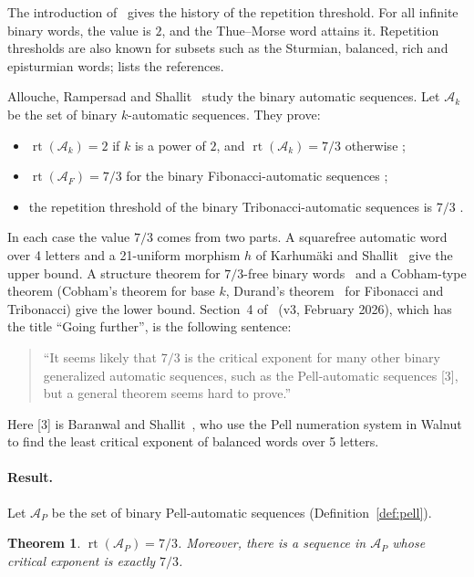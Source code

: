 \documentclass[11pt]{article}
\newtheorem{theorem}{Theorem}
\theoremstyle{definition}
\theoremstyle{remark}
\DeclareMathOperator{\rt}{rt}
\newcommand{\AP}{\mathcal{A}_P}
\begin{document}
The introduction of~\cite{ARS} gives the history of the repetition threshold. For all infinite binary words, the value is $2$, and the Thue--Morse word attains it. Repetition thresholds are also known for subsets such as the Sturmian, balanced, rich and episturmian words; \cite{ARS} lists the references.

Allouche, Rampersad and Shallit~\cite{ARS} study the binary automatic sequences. Let $\mathcal{A}_k$ be the set of binary $k$-automatic sequences. They prove:
\begin{itemize}
\item $\rt(\mathcal{A}_k) = 2$ if $k$ is a power of $2$, and $\rt(\mathcal{A}_k) = 7/3$ otherwise \cite[Theorem~1]{ARS};
\item $\rt(\mathcal{A}_F) = 7/3$ for the binary Fibonacci-automatic sequences \cite[Theorem~11]{ARS};
\item the repetition threshold of the binary Tribonacci-automatic sequences is $7/3$ \cite[Theorem~13]{ARS}.
\end{itemize}
In each case the value $7/3$ comes from two parts. A squarefree automatic word over 4 letters and a 21-uniform morphism $h$ of Karhum\"aki and Shallit~\cite{KS} give the upper bound. A structure theorem for $7/3$-free binary words~\cite{KS,RSS} and a Cobham-type theorem (Cobham's theorem for base $k$, Durand's theorem~\cite{Durand} for Fibonacci and Tribonacci) give the lower bound. Section~4 of~\cite{ARS} (v3, February 2026), which has the title ``Going further'', is the following sentence:
\begin{quote}
``It seems likely that $7/3$ is the critical exponent for many other binary generalized automatic sequences, such as the Pell-automatic sequences [3], but a general theorem seems hard to prove.''
\end{quote}
Here [3] is Baranwal and Shallit~\cite{BS}, who use the Pell numeration system in Walnut to find the least critical exponent of balanced words over 5 letters.

\paragraph{Result.} Let $\AP$ be the set of binary Pell-automatic sequences (Definition~\ref{def:pell}).

\begin{theorem}\label{thm:main}
$\rt(\AP) = 7/3$. Moreover, there is a sequence in $\AP$ whose critical exponent is exactly $7/3$.
\end{theorem}
\end{document}
